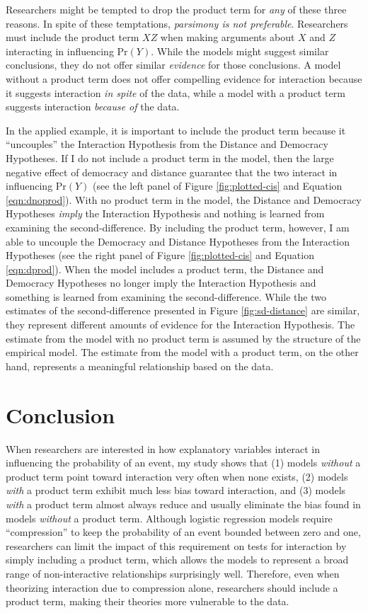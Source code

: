 \documentclass[12pt]{article}
\begin{document}
Researchers might be tempted to drop the product term for \textit{any} of these three reasons. In spite of these temptations, \textit{parsimony is not preferable}. Researchers must include the product term $XZ$ when making arguments about $X$ and $Z$ interacting in influencing $\text{Pr}(Y)$. While the models might suggest similar conclusions, they do not offer similar \textit{evidence} for those conclusions. A model without a product term does not offer compelling evidence for interaction because it suggests interaction \textit{in spite} of the data, while a model with a product term suggests interaction \textit{because of} the data.

In the applied example, it is important to include the product term because it ``uncouples'' the Interaction Hypothesis from the Distance and Democracy Hypotheses. If I do not include a product term in the model, then the large negative effect of democracy and distance guarantee that the two interact in influencing $\text{Pr}(Y)$ (see the left panel of Figure \ref{fig:plotted-cis} and Equation \ref{eqn:dnoprod}). With no product term in the model, the Distance and Democracy Hypotheses \textit{imply} the Interaction Hypothesis and nothing is learned from examining the second-difference. By including the product term, however, I am able to uncouple the Democracy and Distance Hypotheses from the Interaction Hypotheses (see the right panel of Figure \ref{fig:plotted-cis} and Equation \ref{eqn:dprod}). When the model includes a product term, the Distance and Democracy Hypotheses no longer imply the Interaction Hypothesis and something is learned from examining the second-difference. While the two estimates of the second-difference presented in Figure \ref{fig:sd-distance} are similar, they represent different amounts of evidence for the Interaction Hypothesis. The estimate from the model with no product term is assumed by the structure of the empirical model. The estimate from the model with a product term, on the other hand, represents a meaningful relationship based on the data. 
\section*{Conclusion}

When researchers are interested in how explanatory variables interact in influencing the probability of an event, my study shows that (1) models \textit{without} a product term point toward interaction very often when none exists, (2) models \textit{with} a product term exhibit much less bias toward interaction, and (3) models \textit{with} a product term almost always reduce and usually eliminate the bias found in models \textit{without }a product term.  Although logistic regression models require ``compression''  to keep the probability of an event bounded between zero and one, researchers can limit the impact of this requirement on tests for interaction by simply including a product term, which allows the models to represent a  broad range of non-interactive relationships surprisingly well. Therefore, even when theorizing interaction due to compression alone, researchers should include a product term, making their theories more vulnerable to the data.\normalsize

\singlespace

%

\end{document}
